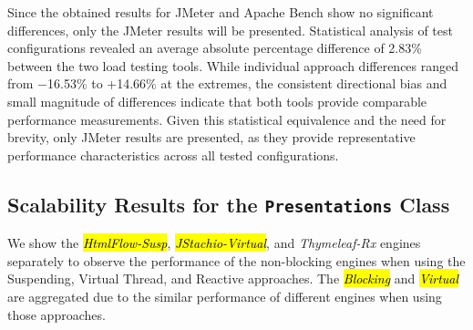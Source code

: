 \documentclass[software,article,accept,pdftex,moreauthors]{Definitions/mdpi}
\begin{document}
Since the obtained results for JMeter and Apache Bench show no significant
differences, only the JMeter results will be presented. Statistical analysis of
test configurations revealed an average absolute percentage difference of
2.83\% between the two load testing tools. While individual approach
differences ranged from $-$16.53\% to +14.66\% at the extremes, the consistent
directional bias and small magnitude of differences indicate that both tools
provide comparable performance measurements. Given this statistical equivalence
and the need for brevity, only JMeter results are presented, as they provide
representative performance characteristics across all tested configurations.

\subsection{Scalability Results for the \texttt{Presentations} Class} \label{sec:presentations-results}


We show the \textit{\hl{HtmlFlow-Susp}}, \textit{\hl{JStachio-Virtual}}, and
\textit{Thymeleaf-Rx} engines separately to observe the performance of the
non-blocking engines when using the Suspending, Virtual Thread, and Reactive
approaches. The \textit{\hl{Blocking}} and \textit{\hl{Virtual}} are aggregated due to
the similar performance of different engines when using those approaches.
\end{document}
